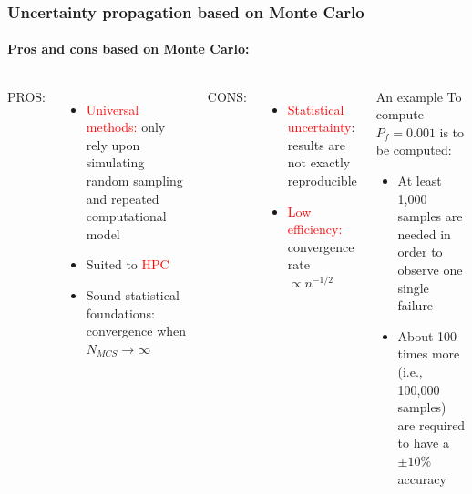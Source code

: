\begin{frame}
\frametitle{Uncertainty propagation based on Monte Carlo}
\framesubtitle{Pros and cons based on Monte Carlo:}

\begin{columns}
    PROS:
    \begin{itemize}
        \item \textcolor{red}{Universal methods:} only rely upon simulating random sampling and repeated computational model
        \item Suited to \textcolor{red}{HPC}
        \item Sound statistical foundations: convergence when $N_{MCS} \rightarrow \infty$
    \end{itemize}
    CONS:
    \begin{itemize}
        \item \textcolor{red}{Statistical uncertainty}: results are not exactly reproducible
        \item \textcolor{red}{Low efficiency:} convergence rate $\propto n^{-1/2}$
    \end{itemize}
    

\begin{example}{An example}
      To compute $P_{f} = 0.001$ is to be computed:
    \begin{itemize}
        \item At least 1,000 samples are needed in order to observe one single failure
        \item About 100 times more (i.e., 100,000 samples) are required to have a $\pm 10\%$ accuracy
    \end{itemize}  
\end{example}

\end{columns}

\end{frame}
